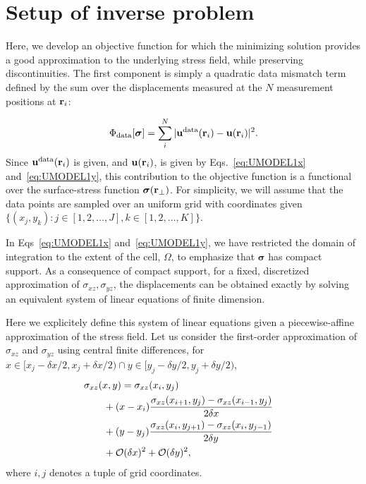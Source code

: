 \documentclass[aps,prl,reprint,twocolumn,groupedaddress,showpacs]{revtex4-1}
\def\r{{\bf r}}
\def\u{{\bf u}}
\newcommand{\bs}{\boldsymbol{\sigma}}
\begin{document}
%




\section{Setup of inverse problem}

Here, we develop an objective function for which the minimizing
solution provides a good approximation to the underlying stress
field, while preserving discontinuities.
 The first component is simply a quadratic data mismatch term
defined by the sum over the displacements measured at the $N$
measurement positions at $\r_{i}$:


\begin{equation}
\Phi_{\rm data}[\bs] = \sum_{i}^{N}\vert \u^{\rm
  data}(\r_{i})- \u(\r_i)\vert^{2}.
\end{equation}
%
Since $\u^{\rm data}(\r_{i})$ is given, and $\u(\r_{i})$, is given by
Eqs.~\ref{eq:UMODEL1x} and~\ref{eq:UMODEL1y}, this contribution to the objective function is a
functional over the surface-stress function $\bs(\r_{\perp})$.  For simplicity, we will assume that 
the data points are sampled over an uniform grid with coordinates given $\{ (x_j,y_k) : j\in[1,2,\ldots,J], k\in[1,2,\ldots,K] \}.$

In Eqs~\ref{eq:UMODEL1x} and~\ref{eq:UMODEL1y}, we have restricted the domain of integration to the extent of the cell, $\Omega$, to emphasize that  $\boldsymbol\sigma$ has compact support. As a consequence of compact support, for a fixed, discretized approximation of $\sigma_{xz},\sigma_{yz}$, the displacements can be obtained exactly by solving an equivalent system of linear equations of finite dimension.

Here we explicitely define this system of linear equations given a piecewise-affine approximation of the stress field. Let us consider the first-order approximation of $\sigma_{xz}$ and $\sigma_{yz}$ using central finite differences, for $x\in[x_j - \delta x/2, x_j+\delta x/2) \cap y\in[y_j-\delta y/2, y_j + \delta y /2)$,
\begin{align}
\lefteqn{\sigma_{xz}(x,y) =\sigma_{xz}(x_i , y_j)  }\nonumber \\
& \qquad+ (x-x_i)\frac{\sigma_{xz}(x_{i+1},y_j) -\sigma_{xz}(x_{i-1},y_j) }{2\delta x}  \nonumber\\
&\qquad + (y-y_j)\frac{\sigma_{xz}(x_i,y_{j+1}) - \sigma_{xz}(x_i,y_{j-1}) }{2\delta y} \nonumber\\
&\qquad + \mathcal{O}(\delta x)^2 + \mathcal{O}(\delta y)^2,\label{eq:sigma_affine}
\end{align}
where $i,j$ denotes a tuple of grid coordinates. 
\end{document}
